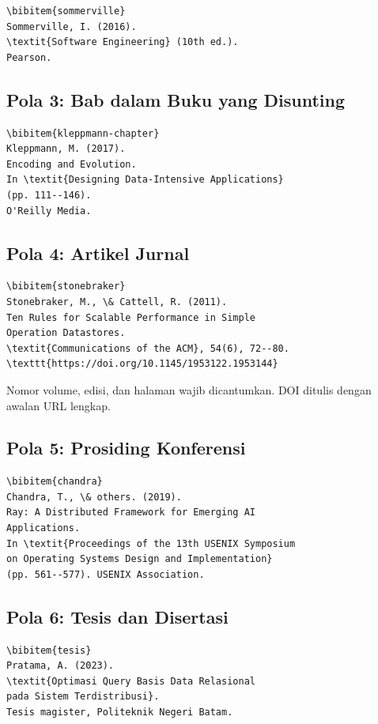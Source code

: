 \documentclass[11pt,a4paper]{article}
\begin{document}
\begin{lstlisting}[style=code]
\bibitem{sommerville}
Sommerville, I. (2016).
\textit{Software Engineering} (10th ed.).
Pearson.
\end{lstlisting}

\subsection{Pola 3: Bab dalam Buku yang Disunting}

\begin{lstlisting}[style=code]
\bibitem{kleppmann-chapter}
Kleppmann, M. (2017).
Encoding and Evolution.
In \textit{Designing Data-Intensive Applications}
(pp. 111--146).
O'Reilly Media.
\end{lstlisting}

\subsection{Pola 4: Artikel Jurnal}

\begin{lstlisting}[style=code]
\bibitem{stonebraker}
Stonebraker, M., \& Cattell, R. (2011).
Ten Rules for Scalable Performance in Simple
Operation Datastores.
\textit{Communications of the ACM}, 54(6), 72--80.
\texttt{https://doi.org/10.1145/1953122.1953144}
\end{lstlisting}

Nomor volume, edisi, dan halaman wajib dicantumkan. DOI ditulis dengan awalan URL lengkap.

\subsection{Pola 5: Prosiding Konferensi}

\begin{lstlisting}[style=code]
\bibitem{chandra}
Chandra, T., \& others. (2019).
Ray: A Distributed Framework for Emerging AI
Applications.
In \textit{Proceedings of the 13th USENIX Symposium
on Operating Systems Design and Implementation}
(pp. 561--577). USENIX Association.
\end{lstlisting}

\subsection{Pola 6: Tesis dan Disertasi}

\begin{lstlisting}[style=code]
\bibitem{tesis}
Pratama, A. (2023).
\textit{Optimasi Query Basis Data Relasional
pada Sistem Terdistribusi}.
Tesis magister, Politeknik Negeri Batam.
\end{lstlisting}
\end{document}
